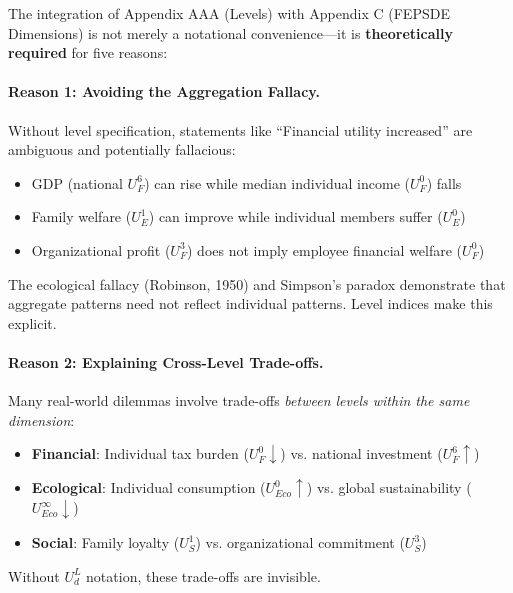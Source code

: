 \begin{tcolorbox}[colback=gray!5!white, colframe=gray!75!black, 
    title=Why AAA $\times$ C Is Theoretically Necessary]

The integration of Appendix AAA (Levels) with Appendix C (FEPSDE Dimensions) is not 
merely a notational convenience---it is \textbf{theoretically required} for five reasons:

\paragraph{Reason 1: Avoiding the Aggregation Fallacy.}

Without level specification, statements like ``Financial utility increased'' are 
ambiguous and potentially fallacious:
\begin{itemize}[nosep]
\item GDP (national $U^6_F$) can rise while median individual income ($U^0_F$) falls
\item Family welfare ($U^1_E$) can improve while individual members suffer ($U^0_E$)
\item Organizational profit ($U^3_F$) does not imply employee financial welfare ($U^0_F$)
\end{itemize}

The ecological fallacy (Robinson, 1950) and Simpson's paradox demonstrate that 
aggregate patterns need not reflect individual patterns. Level indices make this explicit.

\paragraph{Reason 2: Explaining Cross-Level Trade-offs.}

Many real-world dilemmas involve trade-offs \textit{between levels within the same dimension}:
\begin{itemize}[nosep]
\item \textbf{Financial}: Individual tax burden ($U^0_F \downarrow$) vs. national investment ($U^6_F \uparrow$)
\item \textbf{Ecological}: Individual consumption ($U^0_{Eco} \uparrow$) vs. global sustainability ($U^{\infty}_{Eco} \downarrow$)
\item \textbf{Social}: Family loyalty ($U^1_S$) vs. organizational commitment ($U^3_S$)
\end{itemize}

Without $U^L_d$ notation, these trade-offs are invisible.


\end{tcolorbox}
